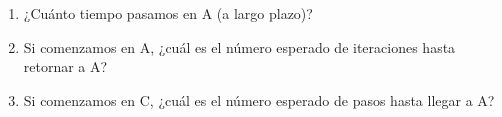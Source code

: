 \documentclass{templateNote}
\begin{document}
\begin{enumerate}
\begin{center}
    \end{center}

    \begin{enumerate}[label=\alph*)]
        \item ¿Cuánto tiempo pasamos en A (a largo plazo)?
        \item Si comenzamos en A, ¿cuál es el número esperado de iteraciones hasta retornar a A?
        \item Si comenzamos en C, ¿cuál es el número esperado de pasos hasta llegar a A?
    \end{enumerate}


\end{enumerate}
\end{document}
